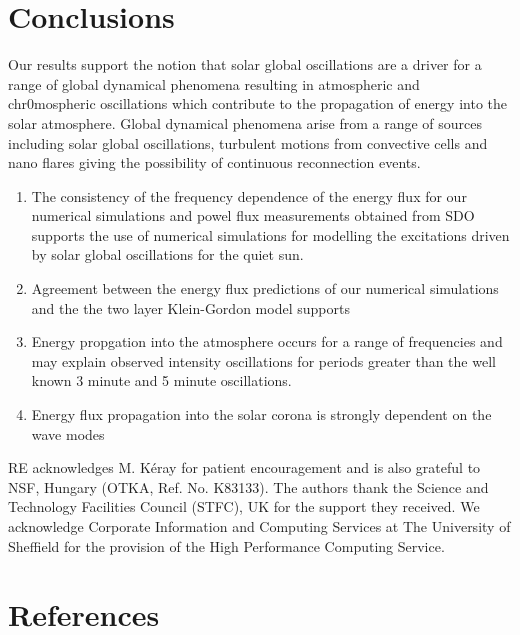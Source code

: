 \documentclass[authoryear,final,1p]{elsarticle}
\begin{document}



\section{Conclusions}

Our results support the notion that solar global oscillations are a driver for a range of global dynamical phenomena resulting in atmospheric and chr0mospheric oscillations which contribute to the propagation of energy into the solar atmosphere.  Global dynamical phenomena arise from a range of sources including solar global oscillations, turbulent motions from convective cells and nano flares giving the possibility of continuous reconnection events.
   \begin{enumerate}
      \item The  consistency of the frequency dependence of the energy flux for our numerical simulations and powel flux measurements obtained from SDO supports the use of numerical simulations for modelling the excitations driven by solar global oscillations for the quiet sun.
      \item Agreement between the energy flux predictions of our numerical simulations and the the two layer Klein-Gordon model supports
      \item Energy propgation into the atmosphere occurs for a range of frequencies and may explain observed intensity oscillations for periods greater than the well known 3 minute and 5 minute oscillations.  
      \item Energy flux propagation into the solar corona is strongly dependent on the wave modes
   \end{enumerate}

\begin{acknowledgements}
RE acknowledges M. K\'eray for patient encouragement and is also grateful to NSF, Hungary (OTKA, Ref. No. K83133). 
The authors thank the Science and Technology Facilities Council (STFC), UK for the support they received. We acknowledge Corporate Information and Computing Services at The University of Sheffield for the provision of the High Performance Computing Service.
\end{acknowledgements}


\section{References}
%

%
%

\end{document}
